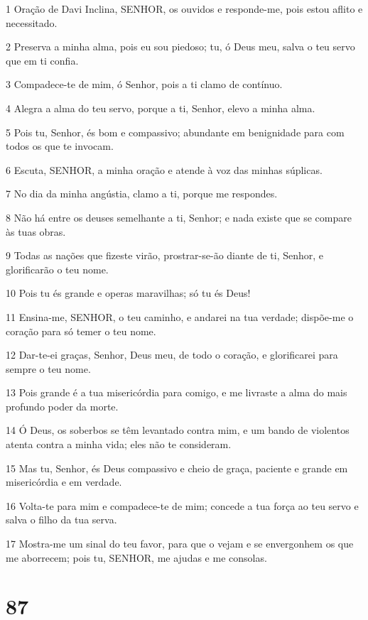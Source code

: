 \par 1 Oração de Davi Inclina, SENHOR, os ouvidos e responde-me, pois estou aflito e necessitado.
\par 2 Preserva a minha alma, pois eu sou piedoso; tu, ó Deus meu, salva o teu servo que em ti confia.
\par 3 Compadece-te de mim, ó Senhor, pois a ti clamo de contínuo.
\par 4 Alegra a alma do teu servo, porque a ti, Senhor, elevo a minha alma.
\par 5 Pois tu, Senhor, és bom e compassivo; abundante em benignidade para com todos os que te invocam.
\par 6 Escuta, SENHOR, a minha oração e atende à voz das minhas súplicas.
\par 7 No dia da minha angústia, clamo a ti, porque me respondes.
\par 8 Não há entre os deuses semelhante a ti, Senhor; e nada existe que se compare às tuas obras.
\par 9 Todas as nações que fizeste virão, prostrar-se-ão diante de ti, Senhor, e glorificarão o teu nome.
\par 10 Pois tu és grande e operas maravilhas; só tu és Deus!
\par 11 Ensina-me, SENHOR, o teu caminho, e andarei na tua verdade; dispõe-me o coração para só temer o teu nome.
\par 12 Dar-te-ei graças, Senhor, Deus meu, de todo o coração, e glorificarei para sempre o teu nome.
\par 13 Pois grande é a tua misericórdia para comigo, e me livraste a alma do mais profundo poder da morte.
\par 14 Ó Deus, os soberbos se têm levantado contra mim, e um bando de violentos atenta contra a minha vida; eles não te consideram.
\par 15 Mas tu, Senhor, és Deus compassivo e cheio de graça, paciente e grande em misericórdia e em verdade.
\par 16 Volta-te para mim e compadece-te de mim; concede a tua força ao teu servo e salva o filho da tua serva.
\par 17 Mostra-me um sinal do teu favor, para que o vejam e se envergonhem os que me aborrecem; pois tu, SENHOR, me ajudas e me consolas.

\chapter{87}

